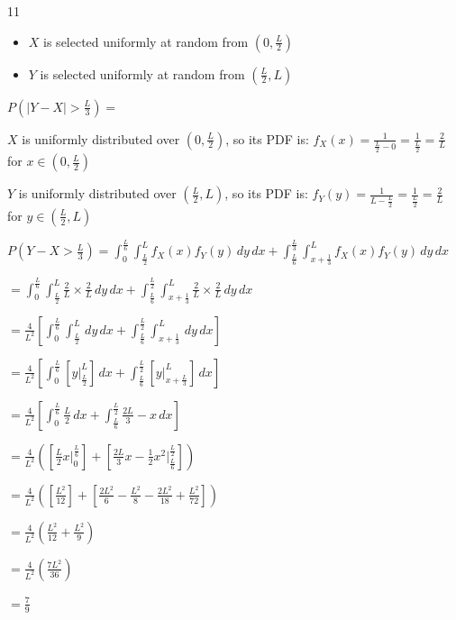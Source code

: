 \documentclass[12 pt]{article}
\begin{document}
    \begin{exercise}{11}
    \hfill

    \begin{itemize}
        \item $X$ is selected uniformly at random from $(0,\frac{L}{2})$
        \item $Y$ is selected uniformly at random from $(\frac{L}{2}, L)$
    \end{itemize}
    $P(|Y-X|>\frac{L}{3})=$

    \hfill

    $X$ is uniformly distributed over $(0, \frac{L}{2})$, so its PDF is:
    $f_X(x) = \frac{1}{\frac{L}{2}-0} = \frac{1}{\frac{L}{2}} = \frac{2}{L}$ for $x \in (0, \frac{L}{2})$

    \hfill

    $Y$ is uniformly distributed over $(\frac{L}{2}, L)$, so its PDF is:
    $f_Y(y) = \frac{1}{L - \frac{L}{2}} = \frac{1}{\frac{L}{2}} = \frac{2}{L}$ for $y \in (\frac{L}{2}, L)$

    \hfill

    $P(Y-X > \frac{L}{3}) = \int_{0}^{\frac{L}{6}} \int_{\frac{L}{2}}^{L} f_X(x) f_Y(y) \, dy \, dx + \int_{\frac{L}{6}}^{\frac{L}{3}} \int_{x+\frac{1}{3}}^{L} f_X(x) f_Y(y) \, dy \, dx$

    $= \int_{0}^{\frac{L}{6}} \int_{\frac{L}{2}}^{L} \frac{2}{L} \times \frac{2}{L} \, dy \, dx + \int_{\frac{L}{6}}^{\frac{L}{2}} \int_{x+\frac{1}{3}}^{L} \frac{2}{L} \times \frac{2}{L} \, dy \, dx$

    $= \frac{4}{L^2} [\int_{0}^{\frac{L}{6}} \int_{\frac{L}{2}}^{L} \, dy \, dx +\int_{\frac{L}{6}}^{\frac{L}{2}} \int_{x+\frac{1}{3}}^{L} \, dy \, dx]$

    $= \frac{4}{L^2} [\int_{0}^{\frac{L}{6}} [y |_{\frac{L}{2}}^{L}] \, dx + \int_{\frac{L}{6}}^{\frac{L}{2}} [y |_{x+\frac{L}{3}}^{L}] \, dx]$

    $= \frac{4}{L^2} [\int_{0}^{\frac{L}{6}} \frac{L}{2} \, dx + \int_{\frac{L}{6}}^{\frac{L}{2}} \frac{2L}{3} - x \, dx]$

    $ = \frac{4}{L^2}([\frac{L}{2}x |_{0}^{\frac{L}{6}}] + [\frac{2L}{3}x - \frac{1}{2}x^2 |_{\frac{L}{6}}^{\frac{L}{2}}])$

    $= \frac{4}{L^2}([\frac{L^2}{12}] + [\frac{2L^2}{6} - \frac{L^2}{8} - \frac{2L^2}{18} + \frac{L^2}{72}])$

    $= \frac{4}{L^2}(\frac{L^2}{12} + \frac{L^2}{9})$

    $= \frac{4}{L^2}(\frac{7L^2}{36})$

    $= \frac{7}{9}$

    \hfill
    \end{exercise}
\end{document}
